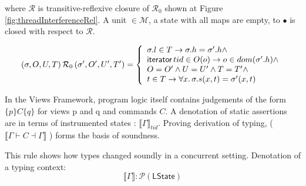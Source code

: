 where $\mathcal{R}$ is transitive-reflexive closure of $\mathcal{R}_{0}$ shown at Figure \ref{fig:threadInterferenceRel}. A unit $\in \mathcal{M}$, a state with all maps are empty, to $\bullet$ is closed with respect to $\mathcal{R}$.
\begin{figure*}[!htbp]
\[
(\sigma, O, U, T) \, \mathcal{R}_{0} \, (\sigma', O', U', T') = \left\{
 \begin{array}{ll}
  \sigma.l  \in  T \rightarrow \sigma.h = \sigma'.h \land\\
  \textsf{iterator} \, tid \in O(o) \rightarrow o \in dom(\sigma'.h) \land \\
  O = O' \land U = U' \land T = T' \land\\
 t \in T \rightarrow \forall x \ldotp \sigma.s(x,t) = \sigma'(x,t)
 \end{array}
 \right.
\]
\caption{Thread Interference Relation}
\label{fig:threadInterferenceRel}
\end{figure*}

In the Views Framework, program logic itself contains judgements of the form $\{ p \} C \{ q \}$ for views p and q and commands $C$. A denotation of static assertions are in terms of instrumented states : $\llbracket \Gamma \rrbracket_{tid}$. Proving derivation of typing, ($\llbracket  \Gamma \vdash C \dashv \Gamma \rrbracket$ ) forms the basis of soundness.

This rule shows how types changed soundly in a concurrent setting. Denotation of a typing context:
\[
 \llbracket \Gamma \rrbracket : \mathcal{P}(\textsf{LState})
\]


